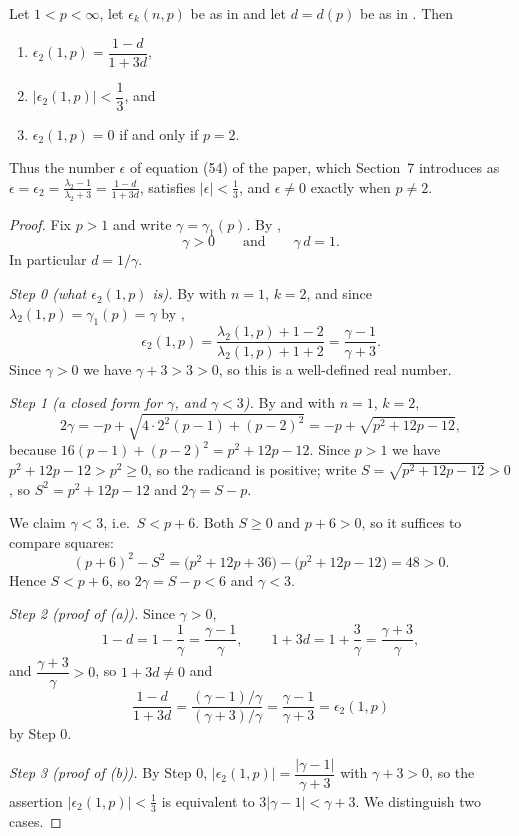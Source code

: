 \begin{lemma}
Let $1<p<\infty$, let $\epsilon_k(n,p)$ be as in  and let
$d=d(p)$ be as in .  Then
\begin{enumerate}
\item[(a)] $\epsilon_2(1,p)=\dfrac{1-d}{1+3d}$,
\item[(b)] $\bigl|\epsilon_2(1,p)\bigr|<\dfrac13$, and
\item[(c)] $\epsilon_2(1,p)=0$ if and only if $p=2$.
\end{enumerate}
Thus the number $\epsilon$ of equation (54) of the paper, which Section~7
introduces as $\epsilon=\epsilon_2=\frac{\lambda_2-1}{\lambda_2+3}=
\frac{1-d}{1+3d}$, satisfies $|\epsilon|<\frac13$, and $\epsilon\neq0$ exactly
when $p\neq2$.
\end{lemma}
\begin{proof}
Fix $p>1$ and write $\gamma=\gamma_1(p)$.  By ,
\[
  \gamma>0\qquad\text{and}\qquad \gamma\, d=1 .
\]
In particular $d=1/\gamma$.

\emph{Step 0 (what $\epsilon_2(1,p)$ is).}  By  with $n=1$,
$k=2$, and since $\lambda_2(1,p)=\gamma_1(p)=\gamma$ by
,
\[
  \epsilon_2(1,p)=\frac{\lambda_2(1,p)+1-2}{\lambda_2(1,p)+1+2}
  =\frac{\gamma-1}{\gamma+3}.
\]
Since $\gamma>0$ we have $\gamma+3>3>0$, so this is a well-defined real
number.

\emph{Step 1 (a closed form for $\gamma$, and $\gamma<3$).}  By
 and  with $n=1$, $k=2$,
\[
  2\gamma=-p+\sqrt{4\cdot2^2(p-1)+(p-2)^2}=-p+\sqrt{p^2+12p-12},
\]
because $16(p-1)+(p-2)^2=p^2+12p-12$.  Since $p>1$ we have
$p^2+12p-12>p^2\ge0$, so the radicand is positive; write
$S=\sqrt{p^2+12p-12}>0$, so $S^2=p^2+12p-12$ and $2\gamma=S-p$.

We claim $\gamma<3$, i.e.\ $S<p+6$.  Both $S\ge0$ and $p+6>0$, so it suffices
to compare squares:
\[
  (p+6)^2-S^2=\bigl(p^2+12p+36\bigr)-\bigl(p^2+12p-12\bigr)=48>0 .
\]
Hence $S<p+6$, so $2\gamma=S-p<6$ and $\gamma<3$.

\emph{Step 2 (proof of (a)).}  Since $\gamma>0$,
\[
  1-d=1-\frac1\gamma=\frac{\gamma-1}{\gamma},
  \qquad
  1+3d=1+\frac3\gamma=\frac{\gamma+3}{\gamma},
\]
and $\dfrac{\gamma+3}{\gamma}>0$, so $1+3d\neq0$ and
\[
  \frac{1-d}{1+3d}
  =\frac{(\gamma-1)/\gamma}{(\gamma+3)/\gamma}
  =\frac{\gamma-1}{\gamma+3}
  =\epsilon_2(1,p)
\]
by Step 0.

\emph{Step 3 (proof of (b)).}  By Step 0,
$|\epsilon_2(1,p)|=\dfrac{|\gamma-1|}{\gamma+3}$ with $\gamma+3>0$, so the
assertion $|\epsilon_2(1,p)|<\frac13$ is equivalent to
$3|\gamma-1|<\gamma+3$.  We distinguish two cases.


\end{proof}
